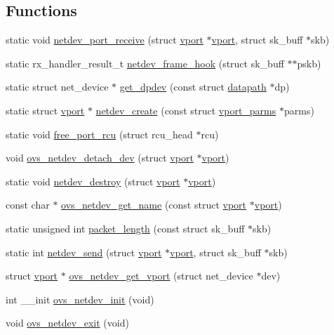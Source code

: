 \subsection*{Functions}
\begin{DoxyCompactItemize}
\item 
static void \hyperlink{linux_2vport-netdev_8c_a203ef31e44d24cc73b6fd99ff15973ae}{netdev\+\_\+port\+\_\+receive} (struct \hyperlink{structvport}{vport} $\ast$\hyperlink{structvport}{vport}, struct sk\+\_\+buff $\ast$skb)
\item 
static rx\+\_\+handler\+\_\+result\+\_\+t \hyperlink{linux_2vport-netdev_8c_a4c69c350d93bf290fea2ff1e9759311d}{netdev\+\_\+frame\+\_\+hook} (struct sk\+\_\+buff $\ast$$\ast$pskb)
\item 
static struct net\+\_\+device $\ast$ \hyperlink{linux_2vport-netdev_8c_ae407cdb3541e622199306fa8e2e6cd92}{get\+\_\+dpdev} (const struct \hyperlink{structdatapath}{datapath} $\ast$dp)
\item 
static struct \hyperlink{structvport}{vport} $\ast$ \hyperlink{linux_2vport-netdev_8c_ae347c95fee1fc936f726d57cce0541f4}{netdev\+\_\+create} (const struct \hyperlink{structvport__parms}{vport\+\_\+parms} $\ast$parms)
\item 
static void \hyperlink{linux_2vport-netdev_8c_a3b01c780c7673ecd1fcb517bb4fef97f}{free\+\_\+port\+\_\+rcu} (struct rcu\+\_\+head $\ast$rcu)
\item 
void \hyperlink{linux_2vport-netdev_8c_ac03887d6d37218f96766a4fe8a29a7f6}{ovs\+\_\+netdev\+\_\+detach\+\_\+dev} (struct \hyperlink{structvport}{vport} $\ast$\hyperlink{structvport}{vport})
\item 
static void \hyperlink{linux_2vport-netdev_8c_a159283a11e7da94bc5e76ca2a2f6ceaa}{netdev\+\_\+destroy} (struct \hyperlink{structvport}{vport} $\ast$\hyperlink{structvport}{vport})
\item 
const char $\ast$ \hyperlink{linux_2vport-netdev_8c_a63439e8a15ca15f649e7cd4c26a79437}{ovs\+\_\+netdev\+\_\+get\+\_\+name} (const struct \hyperlink{structvport}{vport} $\ast$\hyperlink{structvport}{vport})
\item 
static unsigned int \hyperlink{linux_2vport-netdev_8c_a9f2be5b32b1c210d157335d49a1c958b}{packet\+\_\+length} (const struct sk\+\_\+buff $\ast$skb)
\item 
static int \hyperlink{linux_2vport-netdev_8c_a8fde99ce838cbc4e5b5f7c4ccaf07104}{netdev\+\_\+send} (struct \hyperlink{structvport}{vport} $\ast$\hyperlink{structvport}{vport}, struct sk\+\_\+buff $\ast$skb)
\item 
struct \hyperlink{structvport}{vport} $\ast$ \hyperlink{linux_2vport-netdev_8c_adf074c6126d43c3f7ea008ac19d33112}{ovs\+\_\+netdev\+\_\+get\+\_\+vport} (struct net\+\_\+device $\ast$dev)
\item 
int \+\_\+\+\_\+init \hyperlink{linux_2vport-netdev_8c_a70dd93833f5d471ed3951dd80f54a914}{ovs\+\_\+netdev\+\_\+init} (void)
\item 
void \hyperlink{linux_2vport-netdev_8c_ada5333ba6a30c7b472582687565e316c}{ovs\+\_\+netdev\+\_\+exit} (void)
\end{DoxyCompactItemize}
